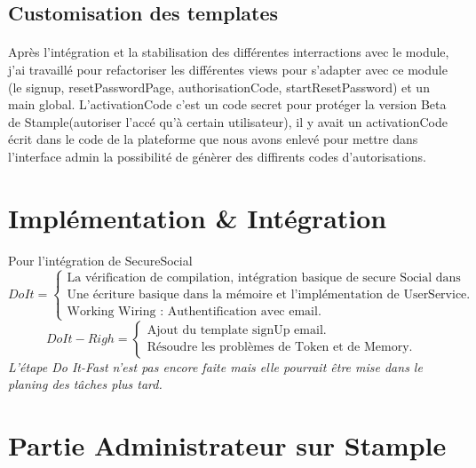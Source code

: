 \subsection{Customisation des templates}
\paragraph{}
Après l'intégration et la stabilisation des différentes interractions avec le module, j'ai travaillé pour refactoriser les différentes views pour s'adapter avec ce module (le signup, resetPasswordPage, authorisationCode, startResetPassword) et un main global.
L'activationCode c'est un code secret pour protéger la version Beta de Stample(autoriser l'accé qu'à certain utilisateur), il y avait un activationCode écrit dans le code de la plateforme que nous avons enlevé pour mettre dans l'interface admin la possibilité de génèrer des diffirents codes d'autorisations.
\section{Implémentation \& Intégration}
Pour l'intégration de SecureSocial 
\[
Do It =
\begin{cases}
\text{La vérification de compilation, intégration basique de secure Social dans Stample.}\\
\text{Une écriture basique dans la mémoire et l'implémentation de UserService.}\\
\text{Working Wiring : Authentification avec email.}
\end{cases}
\]
\[
Do It-Righ =
\begin{cases}
\text{Ajout du template signUp email.}\\
\text{Résoudre les problèmes de Token et de Memory.}
\end{cases}
\]
\textit{L'étape Do It-Fast n'est pas encore faite mais elle pourrait être mise dans le planing des tâches plus tard. }
\section{Partie Administrateur sur Stample}
